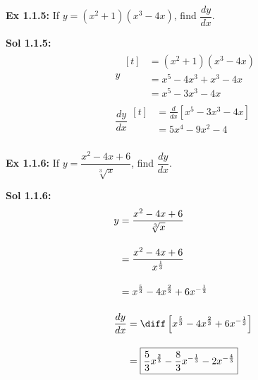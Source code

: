 \begin{tcolorbox}[example]
    \textbf{Ex 1.1.5: } If $y = (x^2 + 1)(x^3 - 4x)$, find $\dfrac{dy}{dx}$. 
\end{tcolorbox}
\begin{tcolorbox}[solution]
    \textbf{Sol 1.1.5: } \begin{align*}
        & y \begin{aligned}[t]
            & = (x^2 + 1)(x^3 - 4x) \\[11pt]
            & = x^5 - 4x^3 + x^3 - 4x \\[11pt]
            & = x^5 - 3x^3 - 4x
        \end{aligned} \\[11pt]
        & \dfrac{dy}{dx} \begin{aligned}[t]
            & = \frac{d}{dx}\left[x^5 - 3x^3 - 4x\right] \\[11pt]
            & = \boxed{5x^4 - 9x^2 - 4} \\
        \end{aligned}
    \end{align*} 
\end{tcolorbox} \vspace{11pt}

\begin{tcolorbox}[example]
    \textbf{Ex 1.1.6: } If $y = \dfrac{x^2 - 4x + 6}{\sqrt[3]{x}}$, find $\dfrac{dy}{dx}$. 
\end{tcolorbox}
\begin{tcolorbox}[solution]
    \textbf{Sol 1.1.6: } \begin{align*}
        & y \begin{aligned}[t]
            & = \dfrac{x^2 - 4x + 6}{\sqrt[3]{x}} \\[11pt]
            & = \dfrac{x^2 - 4x + 6}{x^{\frac{1}{3}}} \\[11pt]
            & = x^{\frac{5}{3}} - 4x^{\frac{2}{3}} + 6x^{-\frac{1}{3}}
        \end{aligned} \\[11pt]
        & \dfrac{dy}{dx} \begin{aligned}[t]
            & = \diff \left[x^{\frac{5}{3}} - 4x^{\frac{2}{3}} + 6x^{-\frac{1}{3}}\right] \\[11pt]
            & = \boxed{\dfrac{5}{3}x^{\frac{2}{3}} - \dfrac{8}{3}x^{-\frac{1}{3}} - 2x^{-\frac{4}{3}}}
        \end{aligned}
    \end{align*}
\end{tcolorbox}

